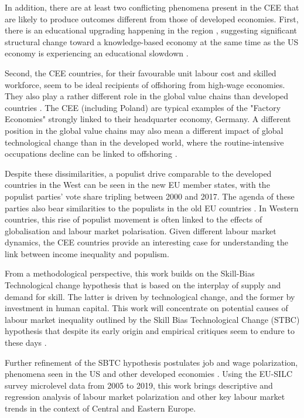 \documentclass[11pt]{article}
\begin{document}
In addition, there are at least two conflicting phenomena present in the CEE that are likely to produce outcomes different from those of developed economies. First, there is an educational upgrading happening in the region \citep{hardy2018educational}, suggesting significant structural change toward a knowledge-based economy at the same time as the US economy is experiencing an educational slowdown \citep{goldin2010race}.

Second, the CEE countries, for their favourable unit labour cost and skilled workforce, seem to be ideal recipients of offshoring from high-wage economies. They also play a rather different role in the global value chains than developed countries \citep{baldwin2015supply}. The CEE (including Poland) are typical examples of the "Factory Economies" strongly linked to their headquarter economy, Germany. 
A different position in the global value chains may also mean a different impact of global technological change than in the developed world, where the routine-intensive occupations decline can be linked to offshoring \citep{acemoglu2012does}.

Despite these dissimilarities, a populist drive comparable to the developed countries in the West can be seen in the new EU member states, with the populist parties' vote share tripling between 2000 and 2017. The agenda of these parties also bear similarities to the populists in the old EU countries \citep{orenstein2022work}. In Western countries, this rise of populist movement is often linked to the effects of globalisation and labour market polarisation. Given different labour market dynamics, the CEE countries provide an interesting case for understanding the link between income inequality and populism. 



From a methodological perspective, this work builds on the Skill-Bias Technological change hypothesis \citep{katz1992changes} that is based on the interplay of supply and demand for skill. The latter is driven by technological change, and the former by investment in human capital. This work will concentrate on potential causes of labour market inequality outlined by the Skill Bias Technological Change (STBC) hypothesis that despite its early origin \citep{katz1992changes} and empirical critiques seem to endure to these days \citep{aziz2021between, goldin2020extending}.

Further refinement of the SBTC hypothesis postulates job and wage polarization, phenomena seen in the US and other developed economies \citep{rodrik2020economic, temin2018vanishing}. Using the EU-SILC survey microlevel data from 2005 to 2019, this work brings descriptive and regression analysis of labour market polarization and other key labour market trends in the context of Central and Eastern Europe.
\end{document}
